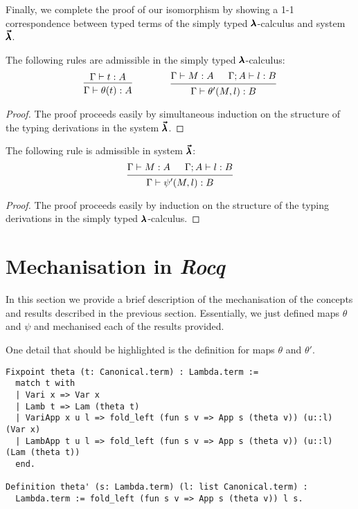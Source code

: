 Finally, we complete the proof of our isomorphism by showing a 1-1 correspondence between typed terms of the simply typed $\pmb{\lambda}$-calculus and system $\pmb{\vec \lambda}$.

\begin{theorem}
  The following rules are admissible in the simply typed $\pmb{\lambda}$-calculus:
  \[ \begin{prooftree}
      \hypo{ \Gamma \vdash t : A }
      \infer1{ \Gamma \vdash \theta(t) : A } 
    \end{prooftree}
    \qquad \qquad
    \begin{prooftree}
      \hypo{ \Gamma \vdash M : A }
      \hypo{ \Gamma ; A \vdash l : B }
      \infer2{ \Gamma \vdash \theta'(M, l) : B }.
    \end{prooftree} \]
\end{theorem}
\begin{proof}
  The proof proceeds easily by simultaneous induction on the structure of the typing derivations in the system $\pmb{\vec \lambda}$.
\end{proof}

\begin{theorem}
  The following rule is admissible in system $\pmb{\vec \lambda}$:
  \[ \begin{prooftree}
      \hypo{ \Gamma \vdash M : A }
      \hypo{ \Gamma ; A \vdash l : B }
      \infer2{ \Gamma \vdash \psi'(M, l) : B }.
    \end{prooftree} \]
\end{theorem}
\begin{proof}
  The proof proceeds easily by induction on the structure of the typing derivations in the simply typed $\pmb{\lambda}$-calculus.
\end{proof}


\section{Mechanisation in \textit{Rocq}}

In this section we provide a brief description of the mechanisation of the concepts and results described in the previous section.
Essentially, we just defined maps $\theta$ and $\psi$ and mechanised each of the results provided.

One detail that should be highlighted is the definition for maps $\theta$ and $\theta'$.
\begin{lstlisting}[language=Coq]
Fixpoint theta (t: Canonical.term) : Lambda.term :=
  match t with
  | Vari x => Var x
  | Lamb t => Lam (theta t)
  | VariApp x u l => fold_left (fun s v => App s (theta v)) (u::l) (Var x)
  | LambApp t u l => fold_left (fun s v => App s (theta v)) (u::l) (Lam (theta t))
  end.

Definition theta' (s: Lambda.term) (l: list Canonical.term) :
  Lambda.term := fold_left (fun s v => App s (theta v)) l s.
\end{lstlisting}

